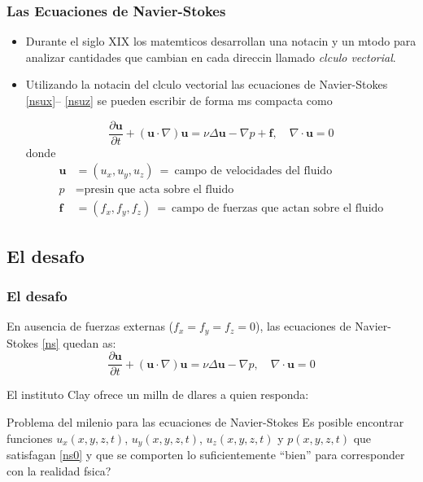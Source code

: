 \documentclass[serif,9pt]{beamer}
\begin{document}
\begin{frame}\frametitle{Las Ecuaciones de Navier-Stokes}

\begin{itemize}

\item  Durante el siglo XIX los matemticos desarrollan una notacin y un mtodo para analizar cantidades que cambian en cada direccin llamado \textit{clculo vectorial}.

\pause
\medskip

\item Utilizando la notacin del clculo vectorial las ecuaciones de Navier-Stokes \eqref{nsux}-- \eqref{nsuz} se pueden escribir de forma ms compacta como

\begin{equation}\label{ns}
\frac{\partial \mathbf{u}}{\partial t} + \left(\mathbf{u} \cdot \nabla\right) \mathbf{u} = \nu \Delta\mathbf{u}  -\nabla p + \mathbf{f}, \quad \nabla\cdot \mathbf{u} = 0 
\end{equation}
donde \pause 
\begin{align*}
 \mathbf{u} &= (u_x,u_y,u_z)\ = \ \mbox{campo de velocidades del fluido}\\
  p &= \mbox{presin que acta sobre el fluido}\\	
  \mathbf{f} &= (f_x,f_y,f_z)\ = \ \mbox{campo de fuerzas que actan sobre el fluido}
\end{align*} %

\end{itemize}
\end{frame}


\subsection{El desafo}
\begin{frame}\frametitle{El desafo} 



En ausencia de fuerzas externas ($f_x=f_y=f_z=0$), las ecuaciones de Navier-Stokes \eqref{ns} quedan as:
\begin{equation}\label{ns0}
\frac{\partial \mathbf{u}}{\partial t} + \left(\mathbf{u} \cdot \nabla\right) \mathbf{u} = \nu \Delta\mathbf{u}  -\nabla p, \quad \nabla\cdot \mathbf{u} = 0 
\end{equation} 
\pause

El instituto Clay ofrece un milln de dlares a quien responda: 
\pause
\medskip

\begin{alertblock}{Problema del milenio para las ecuaciones de Navier-Stokes}
Es posible encontrar funciones $u_x(x,y,z,t)$, $u_y(x,y,z,t)$, $u_z(x,y,z,t)$ y $p(x,y,z,t)$ que satisfagan \eqref{ns0} y que se comporten lo suficientemente ``bien'' para corresponder con la realidad fsica?
\end{alertblock}

\end{frame}
\end{document}
